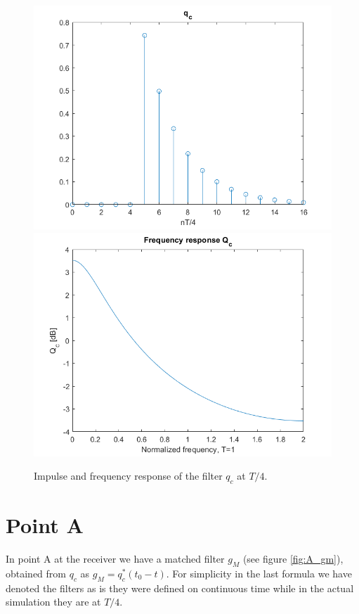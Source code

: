 \documentclass[a4paper,11.5pt]{article}
\begin{document}
\begin{figure}[ht]
	\begin{center}   
		\includegraphics[width=\textwidth]{figs/q_c.png} 
		\includegraphics[width=\textwidth]{figs/Qc.png} 
		\caption{Impulse and frequency response of the filter $q_c$ at $T/4$.}
		\label{fig:qc}
	\end{center}
\end{figure} 

\section*{Point A}

In point A at the receiver we have a matched filter $g_{M}$ (see figure \ref{fig:A_gm}), obtained from $q_c$ as $g_M=q_c^*(t_0-t)$. For simplicity in the last formula we have denoted the filters as is they were defined on continuous time while in the actual simulation they are at $T/4$. 
\end{document}
